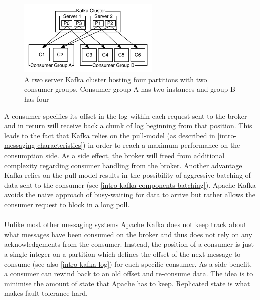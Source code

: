 \begin{figure}[H]
    \centering
    \includegraphics[width=0.6\textwidth]{images/consumer-groups.png}
    \caption{A two server Kafka cluster hosting four partitions with two consumer groups. Consumer group A has two instances and group B has four \cite{apachekafka}}
    \label{fig:the-log}
\end{figure}

A consumer specifies its offset in the log within each request sent to the
broker and in return will receive back a chunk of log beginning from that
position. This leads to the fact that Kafka relies on the pull-model (as
described in \ref{intro-messaging-characteristics}) in order to reach a maximum
performance on the consumption side. As a side effect, the broker will freed
from additional complexity regarding consumer handling from the broker. Another
advantage Kafka relies on the pull-model results in the possibility of
aggressive batching of data sent to the consumer (see
\ref{intro-kafka-components-batching}). Apache Kafka avoids the naive approach
of busy-waiting for data to arrive but rather allows the consumer request to
block in a \gls{long poll}. \cite{apachekafka}
\\ \\
Unlike most other messaging systems Apache Kafka does not keep track about what
messages have been consumed on the broker and thus does not rely on any
acknowledgements from the consumer. Instead, the position of a consumer is just
a single integer on a partition which defines the offset of the next message to
consume (see also \ref{intro-kafka-log}) for each specific consumer. As a side
benefit, a consumer can rewind back to an old offset and re-consume data. The
idea is to minimise the amount of state that Apache has to keep. Replicated state
is what makes fault-tolerance hard. \cite{apachekafka}


